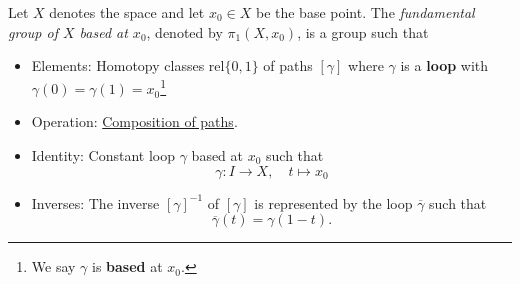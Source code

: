 \begin{definition}\label{def:fundamental-group}
	Let \(X\) denotes the space and let \(x_0\in X\) be the base point. The \emph{fundamental group of \(X\) based at \(x_0\)},
	denoted by \(\pi_1(X, x_0)\), is a group such that
	\begin{itemize}
		\item Elements: Homotopy classes \(\mathrm{rel} \{0, 1\}\) of paths \([\gamma]\) where \(\gamma\) is a \textbf{loop}
		      with \(\gamma(0) = \gamma(1) = x_0\)\footnote{We say \(\gamma\) is \textbf{based} at \(x_0\).}
		      \begin{figure}[H]
			      \centering
			      \label{fig:def:fundamental-group-elements}
		      \end{figure}
		\item Operation: \hyperref[def:path-composition]{Composition of paths}.
		\item Identity: Constant loop \(\gamma\) based at \(x_0\) such that
		      \[
			      \gamma\colon I\to X,\quad t\mapsto x_0
		      \]
		\item Inverses: The inverse \([\gamma]^{-1}\) of \([\gamma]\) is represented by the loop \(\overline{\gamma}\) such that
		      \[
			      \overline{\gamma} (t) = \gamma(1-t).
		      \]
		      \begin{figure}[H]
			      \centering
			      \label{fig:def:fundamental-group-inverses}
		      \end{figure}
	\end{itemize}
\end{definition}
